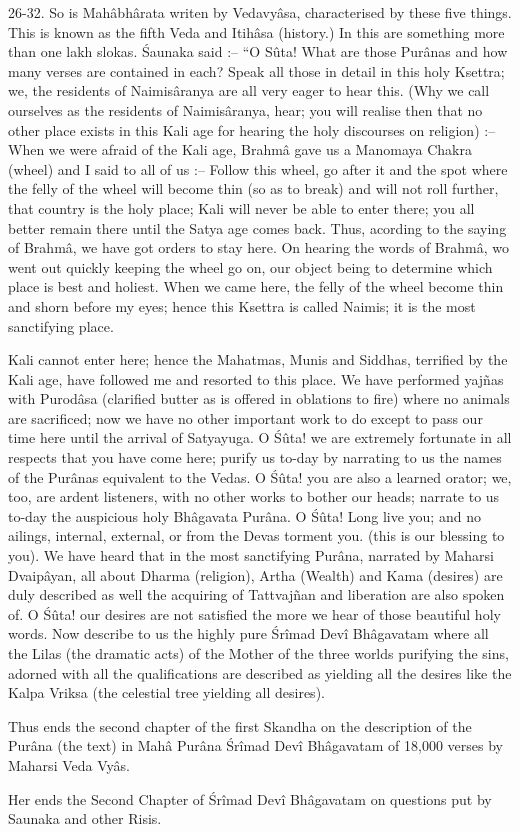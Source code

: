 26-32. So is Mah\^abh\^arata writen by Vedavy\^asa, characterised by these five things. This is known as the fifth Veda and Itih\^asa (history.) In this are something more than one lakh slokas. \'Saunaka said :-- ``O S\^uta! What are those Pur\^anas and how many verses are contained in each? Speak all those in detail in this holy Ksettra; we, the residents of Naimis\^aranya are all very eager to hear this. (Why we call ourselves as the residents of Naimis\^aranya, hear; you will realise then that no other place exists in this Kali age for hearing the holy discourses on religion) :-- When we were afraid of the Kali age, Brahm\^a gave us a Manomaya Chakra (wheel) and I said to all of us :-- Follow this wheel, go after it and the spot where the felly of the wheel will become thin (so as to break) and will not roll further, that country is the holy place; Kali will never be able to enter there; you all better remain there until the Satya age comes back. Thus, acording to the saying of Brahm\^a, we have got orders to stay here. On hearing the words of Brahm\^a, wo went out quickly keeping the wheel go on, our object being to determine which place is best and holiest. When we came here, the felly of the wheel become thin and shorn before my eyes; hence this Ksettra is called Naimis; it is the most sanctifying place.

Kali cannot enter here; hence the Mahatmas, Munis and Siddhas, terrified by the Kali age, have followed me and resorted to this place. We have performed yajñas with Purod\^asa (clarified butter as is offered in oblations to fire) where no animals are sacrificed; now we have no other important work to do except to pass our time here until the arrival of Satyayuga. O \'S\^uta! we are extremely fortunate in all respects that you have come here; purify us to-day by narrating to us the names of the Pur\^anas equivalent to the Vedas. O \'S\^uta! you are also a learned orator; we, too, are ardent listeners, with no other works to bother our heads; narrate to us to-day the auspicious holy Bh\^agavata Pur\^ana. O \'S\^uta! Long live you; and no ailings, internal, external, or from the Devas torment you. (this is our blessing to you). We have heard that in the most sanctifying Pur\^ana, narrated by Maharsi Dvaip\^ayan, all about Dharma (religion), Artha (Wealth) and Kama (desires) are duly described as well the acquiring of Tattvajñan and liberation are also spoken of. O \'S\^uta! our desires are not satisfied the more we hear of those beautiful holy words. Now describe to us the highly pure \'Sr\^imad Dev\^i Bh\^agavatam where all the Lilas (the dramatic acts) of the Mother of the three worlds purifying the sins, adorned with all the qualifications are described as yielding all the desires like the Kalpa Vriksa (the celestial tree yielding all desires).

Thus ends the second chapter of the first Skandha on the description of the Pur\^ana (the text) in Mah\^a Pur\^ana \'Sr\^imad Dev\^i Bh\^agavatam of 18,000 verses by Maharsi Veda Vy\^as.

Her ends the Second Chapter of \'Sr\^imad Dev\^i Bh\^agavatam on questions put by Saunaka and other Risis.

